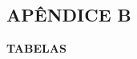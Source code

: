 \clearpage
\vspace*{\fill}
\begin{center}
    \section*{APÊNDICE B}
    \textbf{TABELAS}
\end{center}
\vspace*{\fill}
\clearpage
\newpage



